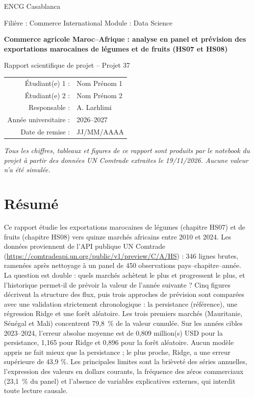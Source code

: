 \documentclass[11pt,a4paper]{article}
\begin{document}
\begin{titlepage}
\centering
{\Large ENCG Casablanca \par}
\vspace{1cm}
{\large Filière : Commerce International \quad Module : Data Science\par}
\vspace{1.8cm}
{\huge\bfseries Commerce agricole Maroc--Afrique : analyse en panel et prévision des exportations marocaines de légumes et de fruits (HS07 et HS08)\par}
\vspace{1.5cm}
{\Large Rapport scientifique de projet -- Projet 37\par}
\vspace{1.5cm}
\begin{tabular}{rl}
Étudiant(e) 1 : & Nom Prénom 1 \\
Étudiant(e) 2 : & Nom Prénom 2 \\
Responsable : & A. Larhlimi \\
Année universitaire : & 2026--2027 \\
Date de remise : & JJ/MM/AAAA \\
\end{tabular}
\vfill
\textit{Tous les chiffres, tableaux et figures de ce rapport sont produits par le notebook du projet à partir des données UN Comtrade extraites le 19/11/2026. Aucune valeur n'a été simulée.}
\end{titlepage}

\section*{Résumé}
Ce rapport étudie les exportations marocaines de légumes (chapitre HS07) et de fruits (chapitre HS08) vers quinze marchés africains entre 2010 et 2024. Les données proviennent de l'API publique UN Comtrade (\url{https://comtradeapi.un.org/public/v1/preview/C/A/HS}) : 346 lignes brutes, ramenées après nettoyage à un panel de 450 observations pays--chapitre--année. La question est double : quels marchés achètent le plus et progressent le plus, et l'historique permet-il de prévoir la valeur de l'année suivante ? Cinq figures décrivent la structure des flux, puis trois approches de prévision sont comparées avec une validation strictement chronologique : la persistance (référence), une régression Ridge et une forêt aléatoire. Les trois premiers marchés (Mauritanie, Sénégal et Mali) concentrent 79,8~\% de la valeur cumulée. Sur les années cibles 2023--2024, l'erreur absolue moyenne est de 0,809 million(s) USD pour la persistance, 1,165 pour Ridge et 0,896 pour la forêt aléatoire. Aucun modèle appris ne fait mieux que la persistance ; le plus proche, Ridge, a une erreur supérieure de 43,9 \%. Les principales limites sont la brièveté des séries annuelles, l'expression des valeurs en dollars courants, la fréquence des zéros commerciaux (23,1~\% du panel) et l'absence de variables explicatives externes, qui interdit toute lecture causale.
\end{document}

